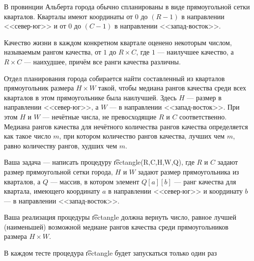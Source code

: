 В провинции Альберта города обычно спланированы в виде прямоугольной сетки кварталов. Кварталы имеют координаты от $0$ до $(R-1)$ в направлении <<север-юг>> и от $0$ до $(C-1)$ в направлении <<запад-восток>>.

Качество жизни в каждом конкретном квартале оценено некоторым числом, называемым рангом качества, от $1$ до $R×C$, где $1$ --- наилучшее качество, а $R×C$ --- наихудшее, причём все ранги качества различны.

Отдел планирования города собирается найти составленный из кварталов прямоугольник размера $H×W$ такой, чтобы медиана рангов качества среди всех кварталов в этом прямоугольнике была наилучшей. Здесь $H$ --- размер в направлении <<север-юг>>, а $W$ --- в направлении <<запад-восток>>. При этом $H$ и $W$ --- нечётные числа, не превосходящие $R$ и $C$ соответственно. Медиана рангов качества для нечётного количества рангов качества определяется как такое число $m$, при котором количество рангов качества, лучших чем $m$, равно количеству рангов, худших чем $m$.

Ваша задача --- написать процедуру \t{rectangle(R,C,H,W,Q)}, где $R$ и $C$ задают размер прямоугольной сетки города, $H$ и $W$ задают размер прямоугольника из кварталов, а $Q$ --- массив, в котором элемент $Q[a][b]$ --- ранг качества для квартала, имеющего координату $a$ в направлении <<север-юг>> и координату $b$ --- в направлении <<запад-восток>>.

Ваша реализация процедуры \t{rectangle} должна вернуть число, равное лучшей (наименьшей) возможной медиане рангов качества среди прямоугольников размера $H×W$.

В каждом тесте процедура \t{rectangle} будет запускаться только один раз